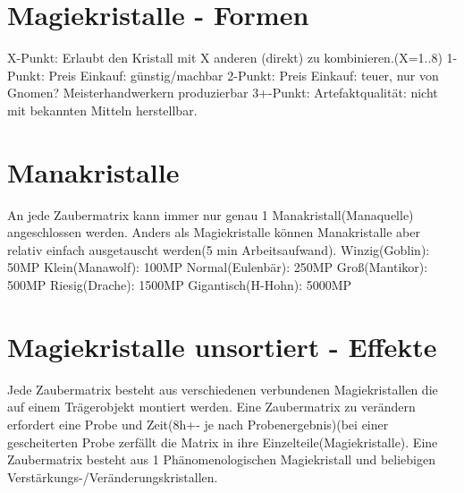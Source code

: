 \section{Magiekristalle - Formen}

X-Punkt: Erlaubt den Kristall mit X anderen (direkt) zu kombinieren.(X=1..8)
1-Punkt: Preis Einkauf: günstig/machbar
2-Punkt: Preis Einkauf: teuer, nur von Gnomen? Meisterhandwerkern produzierbar
3+-Punkt: Artefaktqualität: nicht mit bekannten Mitteln herstellbar.

\section{Manakristalle}
An jede Zaubermatrix kann immer nur genau 1 Manakristall(Manaquelle) angeschlossen werden. Anders als Magiekristalle können Manakristalle aber relativ einfach ausgetauscht werden(5 min Arbeitsaufwand).
Winzig(Goblin): 50MP
Klein(Manawolf): 100MP
Normal(Eulenbär): 250MP
Groß(Mantikor): 500MP
Riesig(Drache): 1500MP
Gigantisch(H-Hohn): 5000MP

\section{Magiekristalle unsortiert - Effekte}
Jede Zaubermatrix besteht aus verschiedenen verbundenen Magiekristallen die auf einem Trägerobjekt montiert werden.
Eine Zaubermatrix zu verändern erfordert eine Probe und Zeit(8h+- je nach Probenergebnis)(bei einer gescheiterten Probe zerfällt die Matrix in ihre Einzelteile(Magiekristalle).
Eine Zaubermatrix besteht aus 1 Phänomenologischen Magiekristall und beliebigen Verstärkungs-/Veränderungskristallen.

